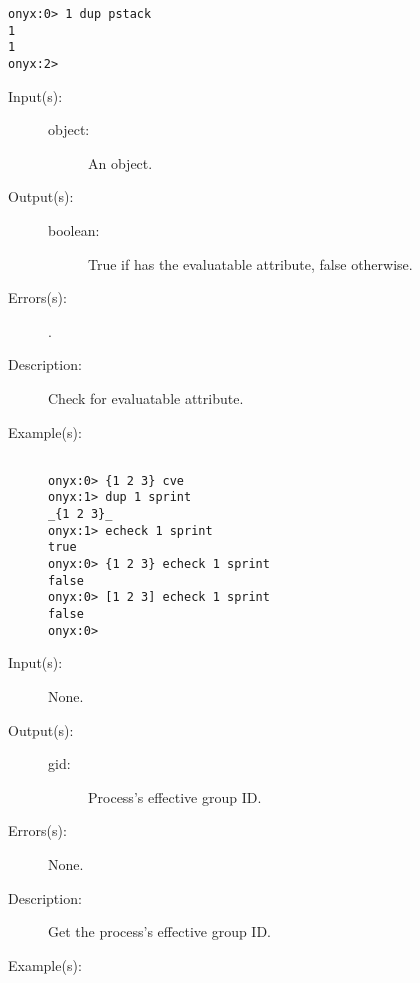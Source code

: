 \begin{description}
\begin{description}
\begin{verbatim}
onyx:0> 1 dup pstack
1
1
onyx:2>
		\end{verbatim}
	\end{description}
\label{systemdict:echeck}
\item[{\onyxop{object}{echeck}{boolean}}: ]
	\begin{description}\item[]
	\item[Input(s): ]
		\begin{description}\item[]
		\item[object: ]
			An object.
		\end{description}
	\item[Output(s): ]
		\begin{description}\item[]
		\item[boolean: ]
			True if  has the evaluatable attribute,
			false otherwise.
		\end{description}
	\item[Errors(s): ]
		\begin{description}\item[]
		\item[.]
		\end{description}
	\item[Description: ]
		Check  for evaluatable attribute.
	\item[Example(s): ]\begin{verbatim}

onyx:0> {1 2 3} cve
onyx:1> dup 1 sprint
_{1 2 3}_
onyx:1> echeck 1 sprint
true
onyx:0> {1 2 3} echeck 1 sprint
false
onyx:0> [1 2 3] echeck 1 sprint
false
onyx:0>
		\end{verbatim}
	\end{description}
\label{systemdict:egid}
\item[{\onyxop{--}{egid}{gid}}: ]
	\begin{description}\item[]
	\item[Input(s): ] None.
	\item[Output(s): ]
		\begin{description}\item[]
		\item[gid: ]
			Process's effective group ID.
		\end{description}
	\item[Errors(s): ] None.
	\item[Description: ]
		Get the process's effective group ID.
	\item[Example(s): ]\begin{verbatim}


\end{verbatim}
\end{description}
\end{description}
